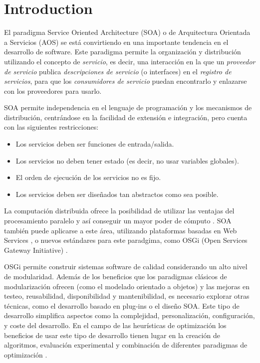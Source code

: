 \documentclass[runningheads]{llncs}
\begin{document}
\section{Introduction}

\noindent El paradigma Service Oriented Architecture (SOA) o de
Arquitectura Orientada a Servicios (AOS) \cite{PAPAZOGLOU} se está
convirtiendo en una importante tendencia en el desarrollo de
software. Este paradigma permite la organización y distribución %
utilizando el concepto de {\em servicio}, es decir, una 
interacción en la que un {\em proveedor de servicio} publica {\em
  descripciones de servicio} (o interfaces) en el {\em registro de
  servicios}, para que los {\em consumidores de servicio} puedan
encontrarlo y enlazarse con los proveedores  para usarlo. 

SOA permite independencia en el lenguaje de programación y los mecanismos de distribución, centrándose en la facilidad de extensión e integración, pero cuenta con las siguientes restricciones:

\begin{itemize}
\item Los servicios deben ser funciones de entrada/salida.
\item Los servicios no deben tener estado (es decir, no usar variables globales).
\item El orden de ejecución de los servicios no es fijo.
\item Los servicios deben ser diseñados tan abstractos como sea
  posible. %
\end{itemize}

La computación distribuida ofrece la posibilidad de utilizar las ventajas del procesamiento paralelo y así conseguir un mayor poder de cómputo \cite{OPENSCIENCEGRID}.
SOA también puede aplicarse a este área, utilizando plataformas basadas en Web Services \cite{PAPAZOGLOU}, o nuevos estándares para este paradgima, como OSGi (Open Services Gateway Initiative) \cite{OSGI}.

OSGi permite construir sistemas software de calidad considerando un alto nivel de modularidad. Además de los beneficios que los paradigmas clásicos de modularización ofrecen (como el modelado orientado a objetos) y las mejoras en testeo, reusabilidad, disponibilidad y mantenibilidad, es necesario explorar otras técnicas, como el desarrollo basado en plug-ins o el diseño SOA. Este tipo de desarrollo simplifica aspectos como la complejidad, personalización, configuración, y coste del desarrollo. En el campo de las heurísticas de optimización los beneficios de usar este tipo de desarrollo tienen lugar en la creación de algoritmos, evaluación experimental y combinación de diferentes paradigmas de optimización \cite{PLUGINS}.
\end{document}
